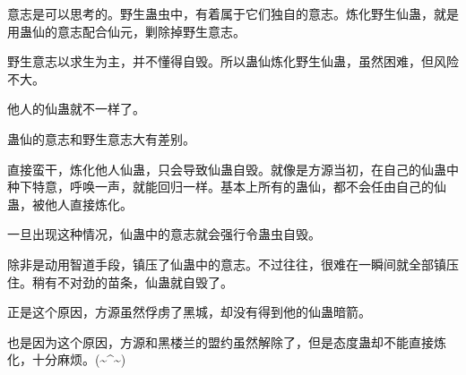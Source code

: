 \begin{this_body}
意志是可以思考的。野生蛊虫中，有着属于它们独自的意志。炼化野生仙蛊，就是用蛊仙的意志配合仙元，剿除掉野生意志。

野生意志以求生为主，并不懂得自毁。所以蛊仙炼化野生仙蛊，虽然困难，但风险不大。

他人的仙蛊就不一样了。

蛊仙的意志和野生意志大有差别。

直接蛮干，炼化他人仙蛊，只会导致仙蛊自毁。就像是方源当初，在自己的仙蛊中种下特意，呼唤一声，就能回归一样。基本上所有的蛊仙，都不会任由自己的仙蛊，被他人直接炼化。

一旦出现这种情况，仙蛊中的意志就会强行令蛊虫自毁。

除非是动用智道手段，镇压了仙蛊中的意志。不过往往，很难在一瞬间就全部镇压住。稍有不对劲的苗条，仙蛊就自毁了。

正是这个原因，方源虽然俘虏了黑城，却没有得到他的仙蛊暗箭。

也是因为这个原因，方源和黑楼兰的盟约虽然解除了，但是态度蛊却不能直接炼化，十分麻烦。(\~{}\^{}\~{})

\end{this_body}

